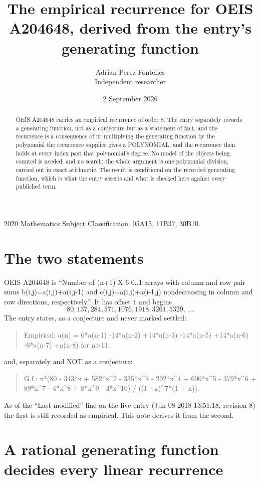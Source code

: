 \documentclass[11pt,a4paper]{article}
\title{The empirical recurrence for OEIS A204648, derived from the entry's generating function}
\author{Adrian Perez Fontelles\\ \small Independent researcher}
\date{2 September 2026}
\theoremstyle{plain}
\theoremstyle{definition}
\begin{document}
\maketitle

\begin{abstract}
OEIS A204648 carries an empirical recurrence of order $8$. The entry separately records a
generating function, not as a conjecture but as a statement of fact, and the recurrence is a
consequence of it: multiplying the generating function by the polynomial the recurrence
supplies gives a POLYNOMIAL, and the recurrence then holds at every index past that
polynomial's degree. No model of the objects being counted is needed, and no search: the
whole argument is one polynomial division, carried out in exact arithmetic. The result is
conditional on the recorded generating function, which is what the entry asserts and what is
checked here against every published term.
\end{abstract}

\noindent\small 2020 Mathematics Subject Classification. 05A15, 11B37, 30B10.\normalsize

\section{The two statements}

OEIS A204648 is ``Number of (n+1) X 6 0..1 arrays with column and row pair sums b(i,j)=a(i,j)+a(i,j-1) and c(i,j)=a(i,j)+a(i-1,j) nondecreasing in column and row directions, respectively.''. It has offset $1$ and begins
\[
80, 137, 284, 571, 1076, 1918, 3261, 5329,\ \dots
\]
The entry states, as a conjecture and never marked settled:
\begin{quote}
Empirical: a(n) = 6*a(n-1) -14*a(n-2) +14*a(n-3) -14*a(n-5) +14*a(n-6) -6*a(n-7) +a(n-8) for n>11.
\end{quote}
and, separately and NOT as a conjecture:
\begin{quote}
G.f.: x*(80 - 343*x + 582*x\^{}2 - 335*x\^{}3 - 292*x\^{}4 + 600*x\^{}5 - 379*x\^{}6 + 89*x\^{}7 - 4*x\^{}8 + 8*x\^{}9 - 4*x\^{}10) / ((1 - x)\^{}7*(1 + x)).
\end{quote}
As of the ``Last modified'' line on the live entry (Jun 08 2018 13:51:18, revision 8) the first is still
recorded as empirical. This note derives it from the second.

\section{A rational generating function decides every linear recurrence}
\end{document}
